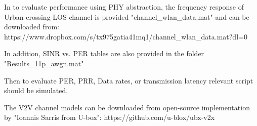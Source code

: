 In to evaluate performance using PHY abstraction, the frequency response of Urban crossing LOS channel is provided "channel_wlan_data.mat" and can be downloaded from: https://www.dropbox.com/s/tx975gatia41mq1/channel_wlan_data.mat?dl=0

In addition, SINR vs. PER tables are also provided in the folder "Results_11p_awgn.mat"

Then to evaluate PER, PRR, Data rates, or transmission latency relevant script should be simulated.

The V2V channel models can be downloaded from open-source implementation by "Ioannis Sarris from U-box": https://github.com/u-blox/ubx-v2x
